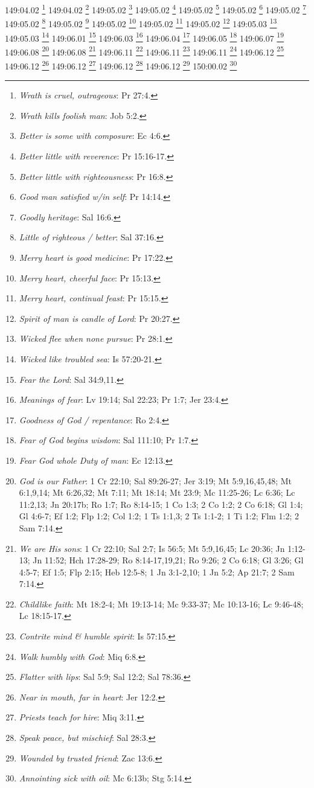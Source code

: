 149:04.02 \footnote{\textit{Wrath is cruel, outrageous}: Pr 27:4.}
149:04.02 \footnote{\textit{Wrath kills foolish man}: Job 5:2.}
149:05.02 \footnote{\textit{Better is some with composure}: Ec 4:6.}
149:05.02 \footnote{\textit{Better little with reverence}: Pr 15:16-17.}
149:05.02 \footnote{\textit{Better little with righteousness}: Pr 16:8.}
149:05.02 \footnote{\textit{Good man satisfied w/in self}: Pr 14:14.}
149:05.02 \footnote{\textit{Goodly heritage}: Sal 16:6.}
149:05.02 \footnote{\textit{Little of righteous / better}: Sal 37:16.}
149:05.02 \footnote{\textit{Merry heart is good medicine}: Pr 17:22.}
149:05.02 \footnote{\textit{Merry heart, cheerful face}: Pr 15:13.}
149:05.02 \footnote{\textit{Merry heart, continual feast}: Pr 15:15.}
149:05.02 \footnote{\textit{Spirit of man is candle of Lord}: Pr 20:27.}
149:05.03 \footnote{\textit{Wicked flee when none pursue}: Pr 28:1.}
149:05.03 \footnote{\textit{Wicked like troubled sea}: Is 57:20-21.}
149:06.01 \footnote{\textit{Fear the Lord}: Sal 34:9,11.}
149:06.03 \footnote{\textit{Meanings of fear}: Lv 19:14; Sal 22:23; Pr 1:7; Jer 23:4.}
149:06.04 \footnote{\textit{Goodness of God / repentance}: Ro 2:4.}
149:06.05 \footnote{\textit{Fear of God begins wisdom}: Sal 111:10; Pr 1:7.}
149:06.07 \footnote{\textit{Fear God whole Duty of man}: Ec 12:13.}
149:06.08 \footnote{\textit{God is our Father}: 1 Cr 22:10; Sal 89:26-27; Jer 3:19; Mt 5:9,16,45,48; Mt 6:1,9,14; Mt 6:26,32; Mt 7:11; Mt 18:14; Mt 23:9; Mc 11:25-26; Lc 6:36; Lc 11:2,13; Jn 20:17b; Ro 1:7; Ro 8:14-15; 1 Co 1:3; 2 Co 1:2; 2 Co 6:18; Gl 1:4; Gl 4:6-7; Ef 1:2; Flp 1:2; Col 1:2; 1 Ts 1:1,3; 2 Ts 1:1-2; 1 Ti 1:2; Flm 1:2; 2 Sam 7:14.}
149:06.08 \footnote{\textit{We are His sons}: 1 Cr 22:10; Sal 2:7; Is 56:5; Mt 5:9,16,45; Lc 20:36; Jn 1:12-13; Jn 11:52; Hch 17:28-29; Ro 8:14-17,19,21; Ro 9:26; 2 Co 6:18; Gl 3:26; Gl 4:5-7; Ef 1:5; Flp 2:15; Heb 12:5-8; 1 Jn 3:1-2,10; 1 Jn 5:2; Ap 21:7; 2 Sam 7:14.}
149:06.11 \footnote{\textit{Childlike faith}: Mt 18:2-4; Mt 19:13-14; Mc 9:33-37; Mc 10:13-16; Lc 9:46-48; Lc 18:15-17.}
149:06.11 \footnote{\textit{Contrite mind & humble spirit}: Is 57:15.}
149:06.11 \footnote{\textit{Walk humbly with God}: Miq 6:8.}
149:06.12 \footnote{\textit{Flatter with lips}: Sal 5:9; Sal 12:2; Sal 78:36.}
149:06.12 \footnote{\textit{Near in mouth, far in heart}: Jer 12:2.}
149:06.12 \footnote{\textit{Priests teach for hire}: Miq 3:11.}
149:06.12 \footnote{\textit{Speak peace, but mischief}: Sal 28:3.}
149:06.12 \footnote{\textit{Wounded by trusted friend}: Zac 13:6.}
150:00.02 \footnote{\textit{Annointing sick with oil}: Mc 6:13b; Stg 5:14.}
